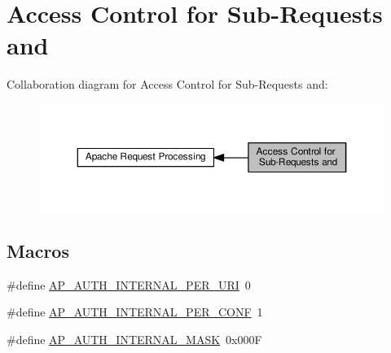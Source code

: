 \hypertarget{group__APACHE__CORE__REQ__AUTH}{}\section{Access Control for Sub-\/\+Requests and}
\label{group__APACHE__CORE__REQ__AUTH}
Collaboration diagram for Access Control for Sub-\/\+Requests and\+:
\nopagebreak
\begin{figure}[H]
\begin{center}
\leavevmode
\includegraphics[width=350pt]{group__APACHE__CORE__REQ__AUTH}
\end{center}
\end{figure}
\subsection*{Macros}
\begin{DoxyCompactItemize}
\item 
\#define \hyperlink{group__APACHE__CORE__REQ__AUTH_ga2cac15f2a8d7e3b7814af1f1da330054}{A\+P\+\_\+\+A\+U\+T\+H\+\_\+\+I\+N\+T\+E\+R\+N\+A\+L\+\_\+\+P\+E\+R\+\_\+\+U\+RI}~0
\item 
\#define \hyperlink{group__APACHE__CORE__REQ__AUTH_ga66027262bdefd7fe1307a5bda9cfe222}{A\+P\+\_\+\+A\+U\+T\+H\+\_\+\+I\+N\+T\+E\+R\+N\+A\+L\+\_\+\+P\+E\+R\+\_\+\+C\+O\+NF}~1
\item 
\#define \hyperlink{group__APACHE__CORE__REQ__AUTH_gac9aded49a0cc62dfdd1e264a752c5da4}{A\+P\+\_\+\+A\+U\+T\+H\+\_\+\+I\+N\+T\+E\+R\+N\+A\+L\+\_\+\+M\+A\+SK}~0x000F
\end{DoxyCompactItemize}
